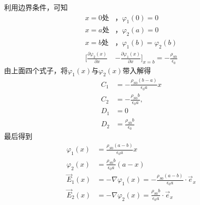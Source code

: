 \documentclass[a4paper]{article}
\begin{document}
		利用边界条件，可知
		\begin{equation}
			\begin{split}
				x = 0处&，\varphi_1(0) = 0\\
				x = a处&，\varphi_2(a) = 0\\
				x = b处&，\varphi_1(b) = \varphi_2(b)\\
				\bigg[ \frac{\partial\varphi_2(x)}{\partial x} &- \frac{\partial\varphi_1(x)}{\partial x} \bigg]_{x=b} = -\frac{\rho_{S0}}{\epsilon_0}
			\end{split}
		\end{equation}
		由上面四个式子，将$\varphi_1(x)$与$\varphi_2(x)$带入解得
		\begin{equation}
			\begin{split}
				C_1 &= -\frac{\rho_{S0}(b-a)}{\epsilon_0 a}x\\
				C_2 &= -\frac{\rho_{S0}b}{\epsilon_0 a},\\
				D_1 &= 0\\
				D_2 &= \frac{\rho_{S0}b}{\epsilon_0}
			\end{split}
		\end{equation}
		最后得到
		\begin{equation}
			\begin{split}
				\varphi_1(x) &= \frac{\rho_{S0}(a-b)}{\epsilon_0 a}x\\
				\varphi_2(x) &= \frac{\rho_{S0}b}{\epsilon_0 a}(a-x)\\
				\vec{E}_1(x) &= -\nabla\varphi_1(x) = -\frac{\rho_{S0}(a-b)}{\epsilon_0 a} \cdot \vec{e}_x\\
				\vec{E}_2(x) &= -\nabla\varphi_2(x) = \frac{\rho_{S0}b}{\epsilon_0 a} \cdot \vec{e}_x
			\end{split}
		\end{equation}
\end{document}
